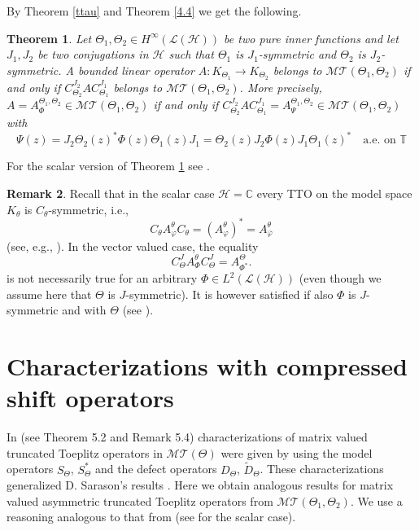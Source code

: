 \documentclass[11pt]{amsart}
\numberwithin{equation}{section}
\newcommand{\hsp}{\mathcal{H}}
\newcommand{\oL }{\mathcal{L}(\hsp) }
\newtheorem{theorem}{Theorem}[section]
\theoremstyle{definition}
\newtheorem{remark}[theorem]{Remark}
\numberwithin{equation}{section}
\begin{document}
By Theorem \ref{ttau} and Theorem \ref{4.4} we get the following.

\begin{theorem}\label{4.5}
Let $\Theta_1, \Theta_2\in H^{\infty}(\oL)$ be two pure inner functions and let $J_1, J_2$ be two conjugations in $\hsp$ such that $\Theta_1$ is $J_1$-symmetric and $\Theta_2$ is $J_2$-symmetric. A bounded linear operator $A:K_{\Theta_1}\to K_{\Theta_2}$ belongs to $\mathcal{MT}(\Theta_1, \Theta_2)$ if and only if $C_{\Theta_2}^{J_2}AC_{\Theta_1}^{J_1}$ belongs to $\mathcal{MT}(\Theta_1, \Theta_2)$. More precisely, $A=A_{\Phi}^{\Theta_1, \Theta_2}\in \mathcal{MT}(\Theta_1, \Theta_2)$ if and only if $C_{\Theta_2}^{J_2}AC_{\Theta_1}^{J_1}=A_{\Psi}^{\Theta_1,\Theta_2}\in \mathcal{MT}(\Theta_1, \Theta_2)$ with
\begin{equation}
\Psi(z)=J_2\Theta_2(z)^*\Phi(z)\Theta_1(z)J_1
=\Theta_2(z)J_2\Phi(z)J_1\Theta_1(z)^*\quad \text{a.e. on } \mathbb{T}
\end{equation}
\end{theorem}
For the scalar version of Theorem \ref{4.5} see \cite{BM}.
\begin{remark}
Recall that in the scalar case $\hsp=\mathbb{C}$ every TTO on the model space $K_\theta$ is $C_\theta$-symmetric, i.e.,
$$C_\theta A_\varphi^\theta C_\theta=(A_\varphi^\theta)^*=A_{\overline{\varphi}}^\theta$$
(see, e.g., \cite{sar}). In the vector valued case, the equality
\begin{equation}\label{eq: 4.12}
C_{\Theta}^J A_{\Phi}^\theta C_{\Theta}^J=A_{\Phi^*}^\Theta.
\end{equation}
is not necessarily true for an arbitrary $\Phi\in L^2(\oL)$ (even though we assume here that $\Theta$ is $J$-symmetric). It is however satisfied if also $\Phi$ is $J$-symmetric and  with $\Theta$ (see \cite{KT}).
\end{remark}

\section{Characterizations with compressed shift operators}\label{s5}

In \cite{KT}(see Theorem 5.2 and Remark 5.4) characterizations of matrix valued truncated Toeplitz operators in
$\mathcal{MT}(\Theta)$ were given by using the model operators $S_{\Theta}$, $S_{\Theta}^*$ and the defect operators $D_{\Theta}$, $\widetilde{D}_{\Theta}$. These characterizations generalized D. Sarason's results \cite{sar}. Here we obtain analogous results for matrix valued asymmetric truncated Toeplitz operators from $\mathcal{MT}(\Theta_{1}, \Theta_{2})$. We use a reasoning analogous to that from \cite{KT} (see \cite{BM} for the scalar case).
\end{document}
